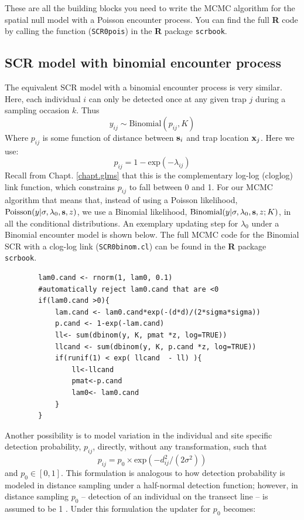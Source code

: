 These are all the building blocks you need to write the MCMC algorithm
for the spatial null model with a Poisson encounter process.  You can
find the full {\bf R} code by calling the function (\mbox{\tt SCR0pois}) in the {\bf R} package
\mbox{\tt scrbook}.

\subsection{SCR model with binomial encounter process}
The equivalent SCR model with a binomial encounter process is very
similar. Here, each individual $i$ can only be detected once at any
given trap $j$ during a sampling occasion $k$.  Thus
\[
y_{ij} \sim \mbox{Binomial} (p_{ij}, K)
\]
Where $p_{ij}$ is some function of distance between ${\bf s}_{i}$ and trap location ${\bf x}_{j}$. Here we use:
\[
p_{ij}=1-\mbox{exp}(-\lambda_{ij})
\]
Recall from Chapt. \ref{chapt.glms} that this is the complementary log-log (cloglog) link function, which constrains $p_{ij}$
to fall between 0 and 1.
For our MCMC algorithm that means that, instead of using a Poisson
likelihood, $\mbox{Poisson}(y|\sigma,\lambda_0,{\bf s},z)$, we use a
Binomial likelihood, $\mbox{Binomial}(y| \sigma,\lambda_0,{\bf s},z; K)$,
in all the conditional distributions. An exemplary updating step for $\lambda_0$ under a Binomial encounter model is shown below.
The full MCMC code for the Binomial SCR with a clog-log link (\mbox{\tt SCR0binom.cl})
can be found in the {\bf R} package \mbox{\tt scrbook}.

\begin{verbatim}
        lam0.cand <- rnorm(1, lam0, 0.1)
        #automatically reject lam0.cand that are <0
        if(lam0.cand >0){
            lam.cand <- lam0.cand*exp(-(d*d)/(2*sigma*sigma))
            p.cand <- 1-exp(-lam.cand)
            ll<- sum(dbinom(y, K, pmat *z, log=TRUE))
            llcand <- sum(dbinom(y, K, p.cand *z, log=TRUE))
            if(runif(1) < exp( llcand  - ll) ){
                ll<-llcand
                pmat<-p.cand
                lam0<- lam0.cand
            }
        }
\end{verbatim}

Another possibility is to model variation in the individual and site
specific detection probability,  $p_{ij}$, directly, without any
transformation, such that
\[
p_{ij} = p_0 \times \mbox{exp}(-d_{ij}^2/(2\sigma^2))
\]
and $p_0 \in [0,1]$.
This formulation is analogous to how detection probability is modeled
in distance sampling under a half-normal detection function; however,
in distance sampling $p_0$ -- detection of an individual on the transect
line -- is assumed to be 1 \citep{buckland_etal:2001}. Under this
formulation the updater for $p_0$ becomes:

